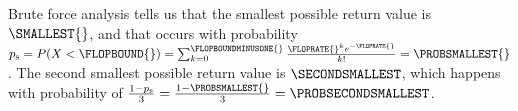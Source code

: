 Brute force analysis tells us that the smallest possible return value is $\SMALLEST{}$, and that occurs with probability $p_{\text{s}} = P(X < \FLOPBOUND{}) = \sum_{k=0}^{\FLOPBOUNDMINUSONE{}}\frac{{\FLOPRATE{}}^{k}{e}^{-\FLOPRATE{}}}{k!} = \PROBSMALLEST{}$.  The second smallest possible return value is $\SECONDSMALLEST$, which happens with probability of $\frac{1 - p_{\text{s}}}{3} = \frac{1 - \PROBSMALLEST{}}{3} = \PROBSECONDSMALLEST$.